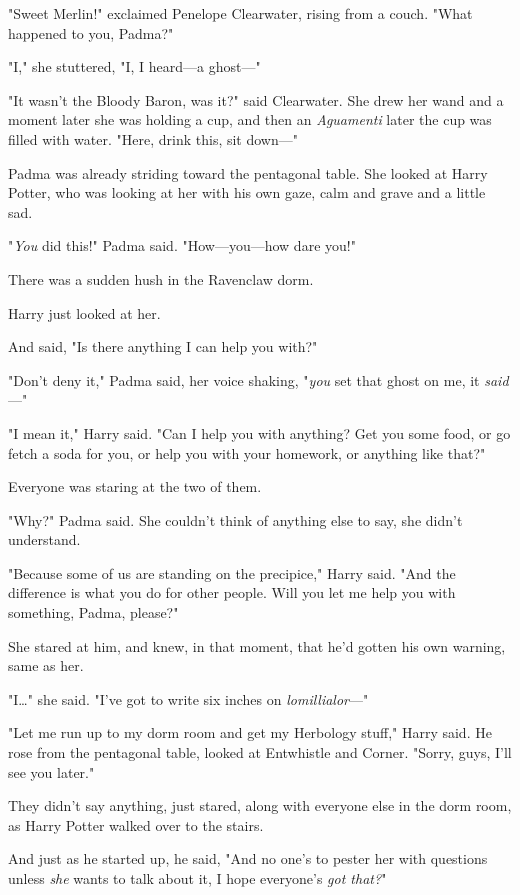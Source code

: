 "Sweet Merlin!" exclaimed Penelope Clearwater, rising from a couch. "What
happened to you, Padma?"

"I," she stuttered, "I, I heard---a ghost---"

"It wasn't the Bloody Baron, was it?" said Clearwater. She drew her wand and a
moment later she was holding a cup, and then an \emph{Aguamenti} later the cup
was filled with water. "Here, drink this, sit down---"

Padma was already striding toward the pentagonal table. She looked at Harry
Potter, who was looking at her with his own gaze, calm and grave and a little
sad.

"\emph{You} did this!" Padma said. "How---you---how dare you!"

There was a sudden hush in the Ravenclaw dorm.

Harry just looked at her.

And said, "Is there anything I can help you with?"

"Don't deny it," Padma said, her voice shaking, "\emph{you} set that ghost on
me, it \emph{said}---"

"I mean it," Harry said. "Can I help you with anything? Get you some food, or
go fetch a soda for you, or help you with your homework, or anything like that?"

Everyone was staring at the two of them.

"Why?" Padma said. She couldn't think of anything else to say, she didn't
understand.

"Because some of us are standing on the precipice," Harry said. "And the
difference is what you do for other people. Will you let me help you with
something, Padma, please?"

She stared at him, and knew, in that moment, that he'd gotten his own warning,
same as her.

"I{\ldots}" she said. "I've got to write six inches on \emph{lomillialor}---"

"Let me run up to my dorm room and get my Herbology stuff," Harry said. He rose
from the pentagonal table, looked at Entwhistle and Corner. "Sorry, guys, I'll
see you later."

They didn't say anything, just stared, along with everyone else in the dorm
room, as Harry Potter walked over to the stairs.

And just as he started up, he said, "And no one's to pester her with questions
unless \emph{she} wants to talk about it, I hope everyone's \emph{got that?}"

